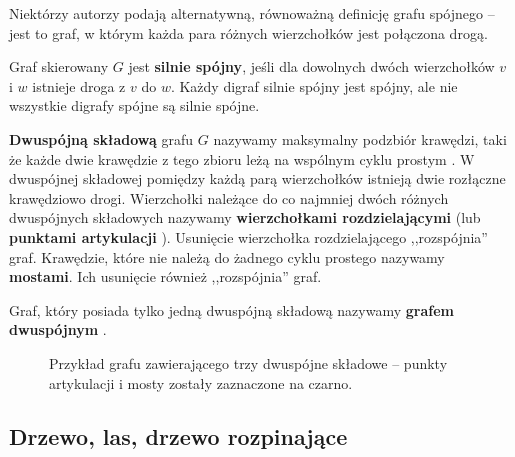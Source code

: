 Niektórzy autorzy \cite[342]{ross} podają alternatywną, równoważną \cite[42]{wilson} definicję grafu spójnego -- jest to graf, w którym każda para różnych wierzchołków jest połączona drogą. 

Graf skierowany $G$ jest \textbf{silnie spójny}, jeśli dla dowolnych dwóch wierzchołków $v$ i $w$ istnieje droga z $v$ do $w$. Każdy digraf silnie spójny jest spójny, ale nie wszystkie digrafy spójne są silnie spójne. 

\textbf{Dwuspójną składową} grafu $G$ nazywamy maksymalny podzbiór krawędzi, taki że każde dwie krawędzie z tego zbioru leżą na wspólnym cyklu prostym \cite[634]{cormen}. W dwuspójnej składowej pomiędzy każdą parą wierzchołków istnieją dwie rozłączne krawędziowo drogi. Wierzchołki należące do co najmniej dwóch różnych dwuspójnych składowych nazywamy \textbf{wierzchołkami rozdzielającymi} (lub \textbf{punktami artykulacji} \cite[633]{cormen}). Usunięcie wierzchołka rozdzielającego ,,rozspójnia'' graf. Krawędzie, które nie należą do żadnego cyklu prostego nazywamy \textbf{mostami}. Ich usunięcie również ,,rozspójnia'' graf.

Graf, który posiada tylko jedną dwuspójną składową nazywamy \textbf{grafem dwuspójnym} \cite[232]{banachowski}.

\begin{figure}[H]
\centering
{}
\captionsetup{justification=centering}
\caption{Przykład grafu zawierającego trzy dwuspójne składowe -- punkty artykulacji i mosty zostały zaznaczone na czarno.} \label{fig:biconnected-copoments-example}
\end{figure}


\subsection*{Drzewo, las, drzewo rozpinające}

